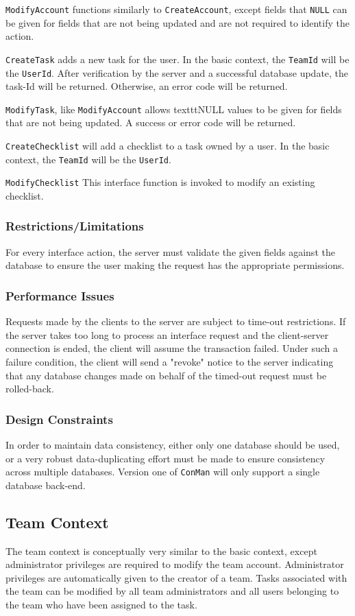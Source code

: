 \documentclass{article}
\begin{document}
\texttt{ModifyAccount} functions similarly to \texttt{CreateAccount}, except fields that \texttt{NULL} can be given for fields that are not being updated and are not required to identify the action.

\texttt{CreateTask} adds a new task for the user. 
In the basic context, the \texttt{TeamId} will be the \texttt{UserId}. 
After verification by the server and a successful database update, the task-Id will be returned.
Otherwise, an error code will be returned.

\texttt{ModifyTask}, like \texttt{ModifyAccount} allows texttt{NULL} values to be given for fields that are not being updated.
A success or error code will be returned.

\texttt{CreateChecklist} will add a checklist to a task owned by a user.
In the basic context, the \texttt{TeamId} will be the \texttt{UserId}.

\texttt{ModifyChecklist} This interface function is invoked to modify an existing checklist.
 
\subsubsection{Restrictions/Limitations}
For every interface action, the server must validate the given fields against the database to ensure the user making the request has the appropriate permissions.
\subsubsection{Performance Issues}
Requests made by the clients to the server are subject to time-out restrictions.  
If the server takes too long to process an interface request and the client-server connection is ended, the client will assume the transaction failed.
Under such a failure condition, the client will send a "revoke" notice to the server indicating that any database changes made on behalf of the timed-out request must be rolled-back.
\subsubsection{Design Constraints}
In order to maintain data consistency, either only one database should be used, or a very robust data-duplicating effort must be made to ensure consistency across multiple databases.  
Version one of \texttt{ConMan} will only support a single database back-end.

\subsection{Team Context}
The team context is conceptually very similar to the basic context, except administrator privileges are required to modify the team account.
Administrator privileges are automatically given to the creator of a team.
Tasks associated with the team can be modified by all team administrators and all users belonging to the team who have been assigned to the task.
\end{document}
